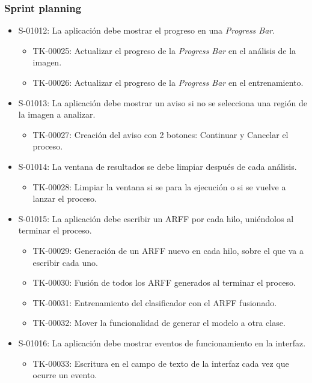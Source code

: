 \subsubsection*{Sprint planning}
\begin{itemize}
 \item S-01012: La aplicación debe mostrar el progreso en una \emph{Progress Bar}.
 \begin{itemize}
   \item TK-00025: Actualizar el progreso de la \emph{Progress Bar} en el análisis de la imagen.
   \item TK-00026: Actualizar el progreso de la \emph{Progress Bar} en el entrenamiento.
  \end{itemize}
 \item S-01013: La aplicación debe mostrar un aviso si no se selecciona una región de la imagen a analizar.
 \begin{itemize}
   \item TK-00027: Creación del aviso con 2 botones: Continuar y Cancelar el proceso.
  \end{itemize}
 \item S-01014: La ventana de resultados se debe limpiar después de cada análisis.
  \begin{itemize}
   \item TK-00028: Limpiar la ventana si se para la ejecución o si se vuelve a lanzar el proceso.
  \end{itemize}
 \item S-01015: La aplicación debe escribir un ARFF por cada hilo, uniéndolos al terminar el proceso.
  \begin{itemize}
   \item TK-00029: Generación de un ARFF nuevo en cada hilo, sobre el que va a escribir cada uno.
   \item TK-00030: Fusión de todos los ARFF generados al terminar el proceso.
   \item TK-00031: Entrenamiento del clasificador con el ARFF fusionado.
   \item TK-00032: Mover la funcionalidad de generar el modelo a otra clase.
  \end{itemize}
 \item S-01016: La aplicación debe mostrar eventos de funcionamiento en la interfaz.
  \begin{itemize}
   \item TK-00033: Escritura en el campo de texto de la interfaz cada vez que ocurre un evento.
  \end{itemize}

\end{itemize}
